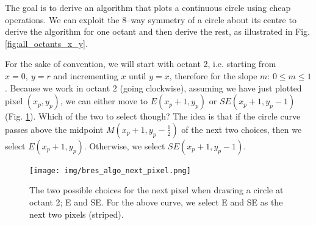 \documentclass[a4paper]{article}
\begin{document}
The goal is to derive an algorithm that plots a continuous circle using cheap operations. We can exploit the 8--way symmetry of a circle about its centre to derive the algorithm for one octant and then derive the rest, as illustrated in Fig. \ref{fig:all_octants_x_y}. 

For the sake of convention, we will start with octant 2, i.e. starting from $x=0,\ y=r$ and incrementing $x$ until $y=x$, therefore for the slope $m$: $0 \leq m \leq 1$. Because we work in octant 2 (going clockwise), assuming we have just plotted pixel $(x_p,y_p)$, we can either move to $E(x_p+1, y_p)$ or $SE(x_p+1, y_p-1)$ (Fig. \ref{fig:bres_algo_next_pixel}). Which of the two to select though? The idea is that if the circle curve passes above the midpoint $M(x_p+1, y_p-\tfrac{1}{2})$ of the next two choices, then we select $E(x_p+1, y_p)$. Otherwise, we select $SE(x_p+1, y_p-1)$.

\begin{figure}[H]
    \centering
    \texttt{[image: img/bres\_algo\_next\_pixel.png]}
    \caption{The two possible choices for the next pixel when drawing a circle at octant 2; E and SE. For the above curve, we select E and SE as the next two pixels (striped).}
    \label{fig:bres_algo_next_pixel}
\end{figure}
\end{document}
